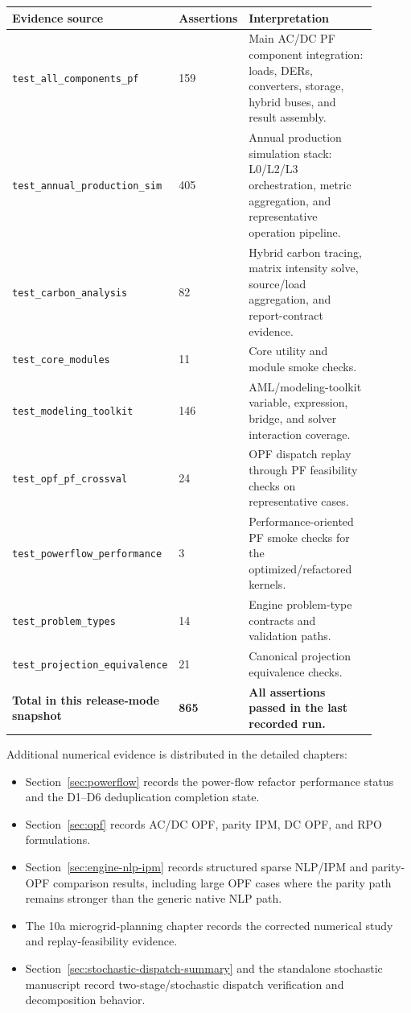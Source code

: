 \begin{longtable}{@{}L{0.31\linewidth}L{0.16\linewidth}L{0.43\linewidth}@{}}
\toprule
Evidence source & Assertions & Interpretation \\
\midrule
\endhead
\texttt{test\_all\_components\_pf} & 159 & Main AC/DC PF component integration: loads, DERs, converters, storage, hybrid buses, and result assembly. \\
\texttt{test\_annual\_production\_sim} & 405 & Annual production simulation stack: L0/L2/L3 orchestration, metric aggregation, and representative operation pipeline. \\
\texttt{test\_carbon\_analysis} & 82 & Hybrid carbon tracing, matrix intensity solve, source/load aggregation, and report-contract evidence. \\
\texttt{test\_core\_modules} & 11 & Core utility and module smoke checks. \\
\texttt{test\_modeling\_toolkit} & 146 & AML/modeling-toolkit variable, expression, bridge, and solver interaction coverage. \\
\texttt{test\_opf\_pf\_crossval} & 24 & OPF dispatch replay through PF feasibility checks on representative cases. \\
\texttt{test\_powerflow\_performance} & 3 & Performance-oriented PF smoke checks for the optimized/refactored kernels. \\
\texttt{test\_problem\_types} & 14 & Engine problem-type contracts and validation paths. \\
\texttt{test\_projection\_equivalence} & 21 & Canonical projection equivalence checks. \\
\textbf{Total in this release-mode snapshot} & \textbf{865} & \textbf{All assertions passed in the last recorded run.} \\
\bottomrule
\end{longtable}

Additional numerical evidence is distributed in the detailed chapters:
\begin{itemize}
  \item Section~\ref{sec:powerflow} records the power-flow refactor performance status and the D1--D6 deduplication completion state.
  \item Section~\ref{sec:opf} records AC/DC OPF, parity IPM, DC OPF, and RPO formulations.
  \item Section~\ref{sec:engine-nlp-ipm} records structured sparse NLP/IPM and parity-OPF comparison results, including large OPF cases where the parity path remains stronger than the generic native NLP path.
  \item The 10a microgrid-planning chapter records the corrected numerical study and replay-feasibility evidence.
  \item Section~\ref{sec:stochastic-dispatch-summary} and the standalone stochastic manuscript record two-stage/stochastic dispatch verification and decomposition behavior.
\end{itemize}

